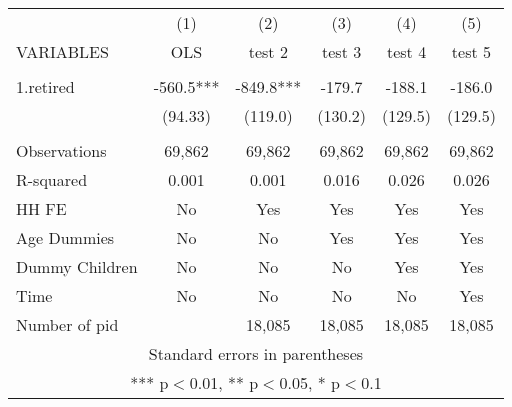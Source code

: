 \begin{tabular}{lccccc} \hline
 & (1) & (2) & (3) & (4) & (5) \\
VARIABLES & OLS & test 2 & test 3 & test 4 & test 5 \\ \hline
 &  &  &  &  &  \\
1.retired & -560.5*** & -849.8*** & -179.7 & -188.1 & -186.0 \\
 & (94.33) & (119.0) & (130.2) & (129.5) & (129.5) \\
 &  &  &  &  &  \\
Observations & 69,862 & 69,862 & 69,862 & 69,862 & 69,862 \\
R-squared & 0.001 & 0.001 & 0.016 & 0.026 & 0.026 \\
HH FE & No & Yes & Yes & Yes & Yes \\
Age Dummies & No & No & Yes & Yes & Yes \\
Dummy Children & No & No & No & Yes & Yes \\
Time & No & No & No & No & Yes \\
 Number of pid &  & 18,085 & 18,085 & 18,085 & 18,085 \\ \hline
\multicolumn{6}{c}{ Standard errors in parentheses} \\
\multicolumn{6}{c}{ *** p$<$0.01, ** p$<$0.05, * p$<$0.1} \\
\end{tabular}
